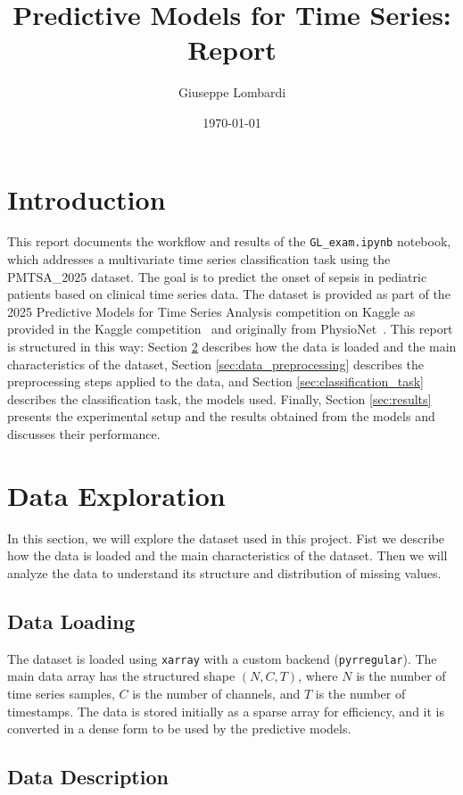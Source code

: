 \documentclass[a4paper,11pt]{article}
\title{Predictive Models for Time Series: Report}
\author{Giuseppe Lombardi}
\date{\today}
\begin{document}
\maketitle

\section{Introduction}
This report documents the workflow and results of the \texttt{GL\_exam.ipynb} notebook,
which addresses a multivariate time series classification task using the PMTSA\_2025 dataset.
The goal is to predict the onset of sepsis in pediatric patients based on clinical time series data.
The dataset is provided as part of the 2025 Predictive Models for Time Series Analysis competition on Kaggle
as provided in the Kaggle competition~\cite{kaggle2025} and originally from PhysioNet~\cite{physionet2019}.
This report is structured in this way: Section \ref{sec:data_exploration} describes how the data is loaded and the main characteristics of the dataset,
Section \ref{sec:data_preprocessing} describes the preprocessing steps applied to the data,
and Section \ref{sec:classification_task} describes the classification task, the models used.
Finally, Section \ref{sec:results} presents the experimental setup and the results obtained from the models and discusses their performance.

\section{Data Exploration}\label{sec:data_exploration}
In this section, we will explore the dataset used in this project. Fist we describe how the data is loaded and the main characteristics of the dataset.
Then we will analyze the data to understand its structure and distribution of missing values.

\subsection{Data Loading}
The dataset is loaded using \texttt{xarray} with a custom backend (\texttt{pyrregular}).
The main data array has the structured shape $(N, C, T)$,
where $N$ is the number of time series samples, $C$ is the number of channels, and $T$ is the number of timestamps.
The data is stored initially as a sparse array for efficiency, and it is converted in a dense form to be used by the predictive models.

\subsection{Data Description}
\end{document}
